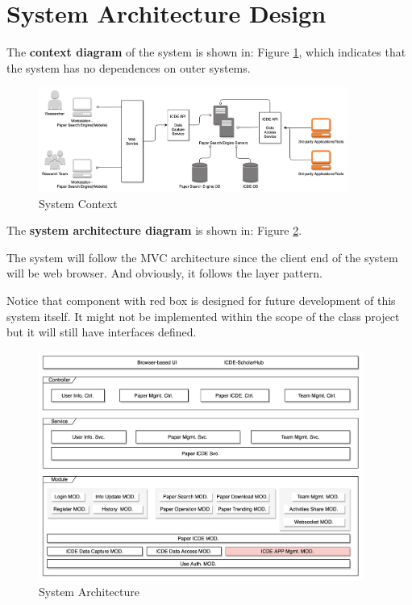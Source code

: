 \section{System Architecture Design}

The \textbf{context diagram} of the system is shown in: Figure \ref{fig:sys-context}, 
which indicates that the system has no dependences on outer systems.

\begin{figure}[!ht]
	\centering
	\includegraphics[width=0.9\textwidth]{./img/sys-context.png}
	\caption{System Context}
	\label{fig:sys-context}
\end{figure}

The \textbf{system architecture diagram} is shown in: Figure \ref{fig:sys-arch}.

The system will follow the MVC architecture since the client end of the system will be web browser. 
And obviously, it follows the layer pattern.

Notice that component with red box is designed for future development of this system itself. 
It might not be implemented within the scope of the class project but it will still have interfaces defined.

\begin{figure}[!ht]
	\centering
	\includegraphics[width=0.95\textwidth]{./img/sys-arch.jpg}
	\caption{System Architecture}
	\label{fig:sys-arch}
\end{figure}
